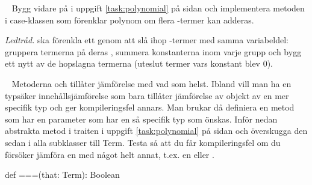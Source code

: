 \QUESTEND




\QUESTBEGIN

\Task  \what~ Bygg vidare på  i uppgift \ref{task:polynomial} på sidan \pageref{task:polynomial} och implementera metoden  i case-klassen  som förenklar polynom om flera -termer kan adderas.

\SOLUTION


\TaskSolved \what
\emph{Ledtråd.}  ska förenkla ett  genom att slå ihop -termer med samma variabeldel: gruppera termerna på deras , summera konstanterna inom varje grupp och bygg ett nytt  av de hopslagna termerna (uteslut termer vars konstant blev 0).



\QUESTEND
















\QUESTBEGIN

\Task  \what~  Metoderna  och \code{==} tillåter jämförelse med vad som helst. Ibland vill man ha en typsäker innehållsjämförelse som bara tillåter jämförelse av objekt av en mer specifik typ och ger kompileringsfel annars. Man brukar då definiera en metod \code{===} som har en parameter  som har en så specifik typ som önskas. Inför nedan abstrakta metod \code{===} i traiten  i uppgift \ref{task:polynomial} på sidan \pageref{task:polynomial} och överskugga den sedan i alla subklasser till Term. Testa så att du får kompileringsfel om du försöker jämföra en  med något helt annat, t.ex. en  eller .
\begin{Code}
  def ===(that: Term): Boolean
\end{Code}


